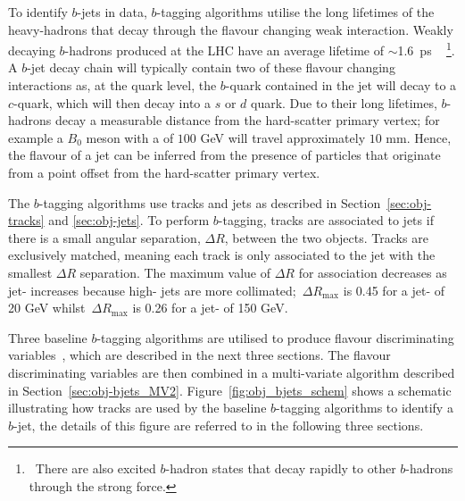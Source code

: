 To identify $b$-jets in data, $b$-tagging algorithms utilise the long lifetimes of the heavy-hadrons that decay through the flavour changing weak interaction.
Weakly decaying $b$-hadrons produced at the LHC have an average lifetime of $\sim$\SI{1.6}{\pico\second} ~\cite{obj-bjets_PDG}
 \footnote{\ There are also excited $b$-hadron states that decay rapidly to other $b$-hadrons through the strong force.}.
A $b$-jet decay chain  will typically contain two of these flavour changing interactions 
as, at the quark level, the $b$-quark contained in the jet will decay to a $c$-quark, which will then decay into a $s$ or $d$ quark.
Due to their long lifetimes, $b$-hadrons decay a measurable distance from the hard-scatter primary vertex;
for example a $B_0$ meson with a \pT{} of $100$ GeV will travel approximately $10$ mm.
Hence, the flavour of a jet can be inferred from the presence of particles
that originate from a point offset from the hard-scatter primary vertex.

The $b$-tagging algorithms use tracks and jets as described in Section~\ref{sec:obj-tracks} and \ref{sec:obj-jets}.
To perform $b$-tagging, tracks are associated to jets if there is a small angular separation, $\Delta R$, between the two objects.
Tracks are exclusively matched, meaning each track is only associated to the jet with the smallest $\Delta R$ separation.
The maximum value of $\Delta R$ for association decreases as jet-\pT{} increases because high-\pT{} jets are more collimated;
$\,\Delta R_{\text{max}}$ is 0.45 for a jet-\pT{} of 20 GeV whilst $\,\Delta R_{\text{max}}$ is 0.26 for a jet-\pT{} of 150 GeV.

Three baseline $b$-tagging algorithms are utilised to produce flavour discriminating variables~\cite{obj-bjets_algo_2016}, which are described in the next three sections.
The flavour discriminating variables are then combined in a multi-variate algorithm described in Section~\ref{sec:obj-bjets_MV2}.
Figure~\ref{fig:obj_bjets_schem} shows a schematic illustrating how tracks
are used by the baseline $b$-tagging algorithms to identify a $b$-jet,
the details of this figure are referred to in the following three sections.

